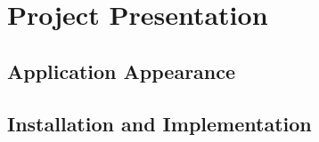 \chapter{Project Presentation}
\section{Application Appearance}
\section{Installation and Implementation}
